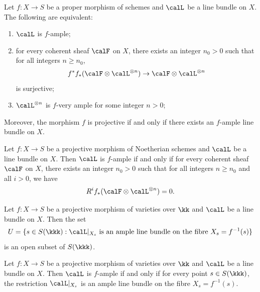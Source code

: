     \begin{theorem}\label{thm:equivalent_definitions_of_relative_ample}
        Let \(f : X \to S\) be a proper morphism of schemes and \(\calL\) be a line bundle on \(X\).
        The following are equivalent:
        \begin{enumerate}
            \item \(\calL\) is \(f\)-ample;
            \item for every coherent sheaf \(\calF\) on \(X\), there exists an integer \(n_0 > 0\) such that for all integers \(n \geq n_0\), 
                \[ f^* f_* (\calF \otimes \calL^{\otimes n}) \to \calF \otimes \calL^{\otimes n} \]
                is surjective;
            \item \(\calL^{\otimes n}\) is \(f\)-very ample for some integer \(n > 0\);
        \end{enumerate}
        Moreover, the morphism \(f\) is projective if and only if there exists an \(f\)-ample line bundle on \(X\).
    \end{theorem}

    \begin{theorem}\label{thm:Serre_vanishing_relatively_version}
        Let \(f : X \to S\) be a projective morphism of Noetherian schemes and \(\calL\) be a line bundle on \(X\).
        Then \(\calL\) is \(f\)-ample if and only if for every coherent sheaf \(\calF\) on \(X\), there exists an integer \(n_0 > 0\) such that for all integers \(n \geq n_0\) and all \(i > 0\), we have
        \[
            R^i f_* (\calF \otimes \calL^{\otimes n}) = 0.
        \]
    \end{theorem}


    \begin{theorem}\label{thm:openness_of_ample_locus}
        Let \(f : X \to S\) be a projective morphism of varieties over \(\kk\) and \(\calL\) be a line bundle on \(X\).
        Then the set
        \[
            U = \{ s \in S(\kkk) : \calL|_{X_s} \text{ is an ample line bundle on the fibre } X_s = f^{-1}(s) \}
        \]
        is an open subset of \(S(\kkk)\).
    \end{theorem}
    

    \begin{theorem}\label{thm:fibrewise_ampleness}
        Let \(f : X \to S\) be a projective morphism of varieties over \(\kk\) and \(\calL\) be a line bundle on \(X\).
        Then \(\calL\) is \(f\)-ample if and only if for every point \(s \in S(\kkk)\), the restriction \(\calL|_{X_s}\) is an ample line bundle on the fibre \(X_s = f^{-1}(s)\).
    \end{theorem}


